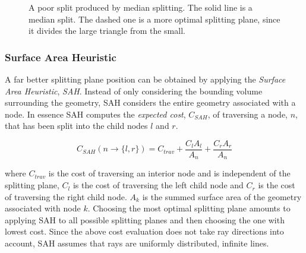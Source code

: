\begin{figure}
  \centering

  \vspace{3mm}
  \parbox{5cm}{\caption[A poor split produced by median splitting.]{A poor split
      produced by median splitting. The solid line is a median split. The dashed
      one is a more optimal splitting plane, since it divides the large triangle
      from the small.}\label{fig:crapMedian}}
\end{figure}

\subsubsection{Surface Area Heuristic}\label{sec:SAH}


A far better splitting plane position can be obtained by applying the
\textit{Surface Area Heuristic}, \textit{SAH}. Instead of only considering the
bounding volume surrounding the geometry, SAH considers the entire geometry
associated with a node. In essence SAH computes the \textit{expected cost},
$C_{SAH}$, of traversing a node, $n$, that has been split into the child nodes
$l$ and $r$.

\begin{displaymath}
  C_{SAH}(n \rightarrow \{l, r\}) = C_{trav} + \frac{C_l A_l}{A_n} +
  \frac{C_r A_r}{A_n}
\end{displaymath}

where $C_{trav}$ is the cost of traversing an interior node and is independent
of the splitting plane, $C_l$ is the cost of traversing the left child node and
$C_r$ is the cost of traversing the right child node. $A_k$ is the summed
surface area of the geometry associated with node $k$. Choosing the most optimal
splitting plane amounts to applying SAH to all possible splitting planes and
then choosing the one with lowest cost. Since the above cost evaluation does not
take ray directions into account, SAH assumes that rays are uniformly
distributed, infinite lines.

